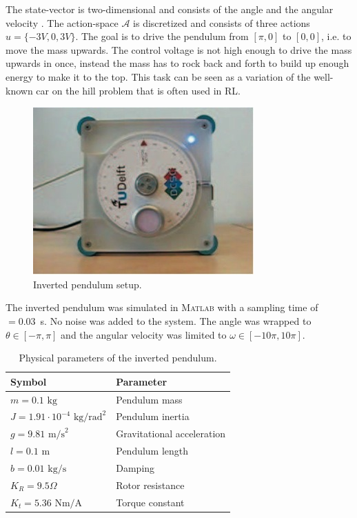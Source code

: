 The state-vector is two-dimensional and consists of the angle  and the angular velocity . The action-space $\mathcal{A}$ is discretized and consists of three actions $u = \{-3V, 0, 3V\}$. The goal is to drive the pendulum from $[\pi,0]$ to $[0,0]$, i.e. to move the mass upwards. The control voltage is not high enough to drive the mass upwards in once, instead the mass has to rock back and forth to build up enough energy to make it to the top. This task can be seen as a variation of the well-known car on the hill problem that is often used in \ac{RL}.

\begin{figure}[htbp]
	\centering
		\includegraphics[width=.5\textwidth]{img/pendulum}
	\caption[Inverted pendulum setup]{Inverted pendulum setup.}
	\label{fig:PS-Inverted pendulum setup}
\end{figure}
The inverted pendulum was simulated in \textsc{Matlab} with a sampling time of ~$ = 0.03$~s. No noise was added to the system. The angle was wrapped to $\theta \in [-\pi, \pi]$ and the angular velocity was limited to $\omega \in [-10\pi, 10\pi]$. 

\begin{table}[htbp]
	\centering
	\caption[Inverted pendulum: Parameter values]{Physical parameters of the inverted pendulum.}
		\begin{tabular}{ll}
			\textbf{Symbol} & \textbf{Parameter} \\ \hline
			$m = 0.1 \textrm{ kg}$ & Pendulum mass \\
			$J = 1.91\cdot 10^{-4} \textrm{ kg/rad}^2$ & Pendulum inertia \\ %
			$g = 9.81 \textrm{ m/s}^2$ & Gravitational acceleration \\
			$l = 0.1 \textrm{ m}$ & Pendulum length \\
			$b = 0.01 \textrm{ kg/s}$ & Damping \\
			$K_R = 9.5 \Omega$ & Rotor resistance \\ %
			$K_t = 5.36 \textrm{ Nm/A}$ & Torque constant %
		\end{tabular}
	\label{tab:PS-inverted pendulum parameters}
\end{table}



